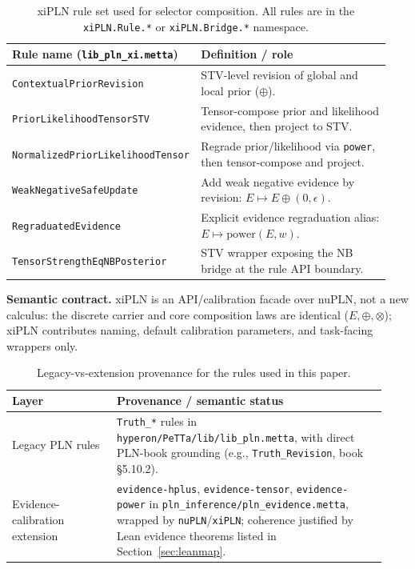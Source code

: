 \documentclass[11pt]{article}
\newcommand{\lpath}[1]{\texttt{\nolinkurl{#1}}}
\newcommand{\lid}[1]{{\ttfamily\nolinkurl{#1}}}
\begin{document}
\begin{table}[h]
\centering
\begin{scriptsize}
\begin{tabular}{@{}L{0.44\linewidth}L{0.50\linewidth}@{}}
\toprule
\textbf{Rule name (\lid{lib_pln_xi.metta})} & \textbf{Definition / role} \\
\midrule
\lid{ContextualPriorRevision}
& STV-level revision of global and local prior (\(\oplus\)). \\
\lid{PriorLikelihoodTensorSTV}
& Tensor-compose prior and likelihood evidence, then project to STV. \\
\lid{NormalizedPriorLikelihoodTensor}
& Regrade prior/likelihood via \lid{power}, then tensor-compose and project. \\
\lid{WeakNegativeSafeUpdate}
& Add weak negative evidence by revision: \(E \mapsto E \oplus (0,\epsilon)\). \\
\lid{RegraduatedEvidence}
& Explicit evidence regraduation alias: \(E \mapsto \mathrm{power}(E,w)\). \\
\lid{TensorStrengthEqNBPosterior}
& STV wrapper exposing the NB bridge at the rule API boundary. \\
\bottomrule
\end{tabular}
\end{scriptsize}
\caption{xiPLN rule set used for selector composition.
All rules are in the \lid{xiPLN.Rule.*} or \lid{xiPLN.Bridge.*} namespace.}
\label{tab:xipln-rules}
\end{table}

\noindent
\textbf{Semantic contract.} xiPLN is an API/calibration facade over nuPLN,
not a new calculus: the discrete carrier and core composition laws are identical
(\(E,\oplus,\otimes\)); xiPLN contributes naming, default calibration parameters,
and task-facing wrappers only.

\begin{table}[h]
\centering
\begin{scriptsize}
\begin{tabular}{p{0.26\linewidth}p{0.67\linewidth}}
\toprule
\textbf{Layer} & \textbf{Provenance / semantic status} \\
\midrule
Legacy PLN rules & \lid{Truth_*} rules in \lpath{hyperon/PeTTa/lib/lib_pln.metta},
with direct PLN-book grounding (e.g., \lid{Truth_Revision}, book \S5.10.2). \\
Evidence-calibration extension & \lid{evidence-hplus}, \lid{evidence-tensor},
\lid{evidence-power} in \lpath{pln_inference/pln_evidence.metta}, wrapped by
\lid{nuPLN}/\lid{xiPLN}; coherence justified by Lean evidence theorems listed in
Section~\ref{sec:leanmap}. \\
\bottomrule
\end{tabular}
\end{scriptsize}
\caption{Legacy-vs-extension provenance for the rules used in this paper.}
\label{tab:legacy-vs-extension}
\end{table}
\end{document}
